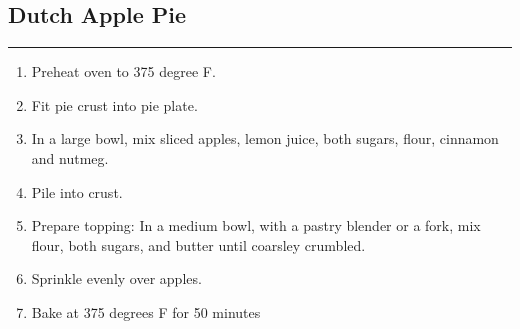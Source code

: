 \documentclass{article}
\begin{document}
\subsection{Dutch Apple Pie} 
\noindent\rule[0.5ex]{\linewidth}{1pt}


\begin{enumerate}
    \item 
        Preheat oven to 375 degree F.
    \item
        Fit pie crust into pie plate.
    \item 
        In a large bowl, mix sliced apples, lemon juice, both sugars, flour, cinnamon and nutmeg.
    \item 
        Pile into crust.
    \item
        Prepare topping: In a medium bowl, with a pastry blender or a fork, mix flour, both sugars, and butter until coarsley crumbled.
    \item
        Sprinkle evenly over apples.
    \item 
        Bake at 375 degrees F for 50 minutes
\end{enumerate}
\newpage
\end{document}
